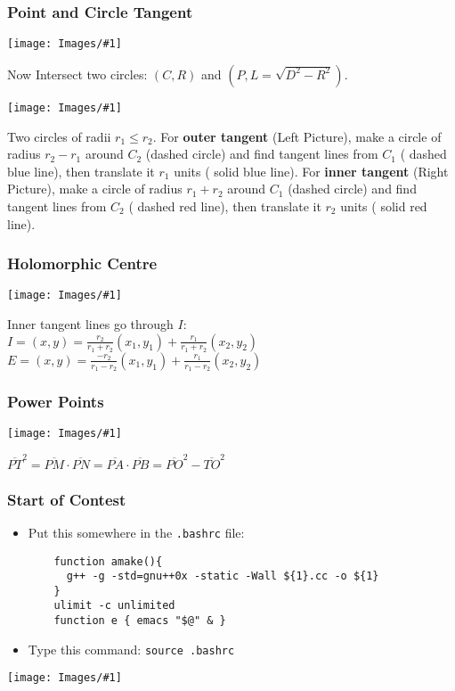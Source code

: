 \documentclass[landscape,10pt]{article}
\newcommand{\myimage}[2]{\begin{center}\texttt{[image: Images/\#1]}\end{center}}
\begin{document}
\begin{multicols*}{2}

\subsubsection*{Point and Circle Tangent}
\myimage{point_tangent.png}{1.25in}
Now Intersect two circles: $(C,R)$ and $(P,L=\sqrt{D^2-R^2})$.

\myimage{cir_cir_tang.png}{1.25in}
Two circles of radii $r_1 \leq r_2$. For {\bf outer tangent} (Left Picture), make a circle of radius $r_2-r_1$ around $C_2$ (dashed circle) and find tangent lines from $C_1$ ({\color{blue} dashed blue line}), then translate it $r_1$ units ({\color{blue} solid blue line}). For {\bf inner tangent} (Right Picture), make a circle of radius $r_1+r_2$ around $C_1$ (dashed circle) and find tangent lines from $C_2$ ({\color{red} dashed red line}), then translate it $r_2$ units ({\color{red} solid red line}).

\subsubsection*{Holomorphic Centre}
\myimage{holo_centre.pdf}{1.5in}
Inner tangent lines go through $I$: \\
$I = (x,y) = \frac{r_2}{r_1+r_2}(x_1,y_1) + \frac{r_1}{r_1+r_2}(x_2,y_2)$ \hskip 20pt
$E = (x,y) = \frac{-r_2}{r_1-r_2}(x_1,y_1) + \frac{r_1}{r_1-r_2}(x_2,y_2)$

\subsubsection*{Power Points}
\myimage{power_point.pdf}{1.5in}
$\overline{PT}^2 = \overline{PM} \cdot \overline{PN} = \overline{PA} \cdot \overline{PB} = \overline{PO}^2 - \overline{TO}^2$

\subsubsection*{Start of Contest}

\begin{itemize}
 \item Put this somewhere in the \texttt{.bashrc} file:
   \begin{lstlisting}
    function amake(){
      g++ -g -std=gnu++0x -static -Wall ${1}.cc -o ${1}
    }
    ulimit -c unlimited
    function e { emacs "$@" & }
   \end{lstlisting}
 \item Type this command: \texttt{source .bashrc}
\end{itemize}

\myimage{Inspiration.jpg}{1.3in}

\end{multicols*}
\end{document}
